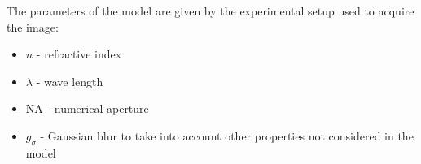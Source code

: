 \documentclass[a0paper,portrait,fontscale=0.35]{baposter}
\theoremstyle{plain}
\theoremstyle{plain}
\theoremstyle{definition}
\theoremstyle{plain}
\theoremstyle{definition}
\begin{document}
\begin{poster}
{  \vspace{10pt}
  \begin{minipage}[t]{\textwidth}
    \begin{minipage}[t]{0.38\textwidth}
      The parameters of the model are given by
      the experimental setup used to acquire the image:
      \begin{itemize}
        \item $n$ - refractive index
        \item $\lambda$ - wave length
        \item NA - numerical aperture
        \item $g_{\sigma}$ - Gaussian blur to take into account
          other properties not considered in the model
      \end{itemize}
    \end{minipage}
    \begin{minipage}[t]{0.3\textwidth}
      \centering


\end{minipage}
\end{minipage}}
\end{poster}
\end{document}
